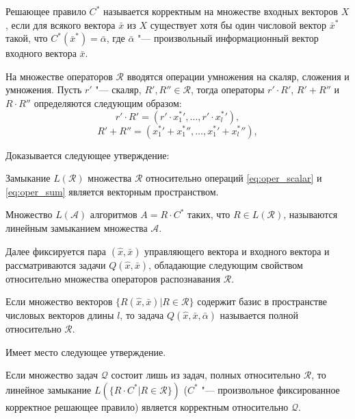 \begin{Def}
	Решающее правило $C^*$ называется корректным на множестве входных векторов $X$, если для всякого вектора $\bar x$ из $X$ существует хотя бы один числовой вектор $\bar x^*$ такой, что $C^*(\bar{x}^*)=\bar{\alpha}$, где $\bar{\alpha}$ "--- произвольный информационный вектор входного вектора $\bar{x}$.
\end{Def}
На множестве операторов $\mathcal R$ вводятся операции умножения на скаляр, сложения и умножения. Пусть $r'$ "--- скаляр, $R',R''\in\mathcal R$, тогда операторы $r'{\cdot}R'$, $R'+R''$ и $R{\cdot}R''$ определяются следующим образом:
\begin{equation}
\label{eq:oper_scalar}
r'{\cdot}R'=(r'{\cdot}{x_1^*}',\dots,r'{\cdot}{x_l^*}'),
\end{equation}
\begin{equation}
\label{eq:oper_sum}
R'+R''=({x_1^*}'+{x_1^*}'',\dots,{x_1^*}'+{x_l^*}''),
\end{equation}

Доказывается следующее утверждение:
\begin{Pred}
	Замыкание $L(\mathcal R)$ множества $\mathcal R$ относительно операций \eqref{eq:oper_scalar} и \eqref{eq:oper_sum} является векторным пространством.
\end{Pred}
\begin{Def}
	Множество $L(\mathcal A)$ алгоритмов $A=R{\cdot}C^*$ таких, что $R{\in}L(\mathcal R)$, называются линейным замыканием множества $\mathcal A$.
\end{Def}

Далее фиксируется пара $(\hat{x},\bar{x})$ управляющего вектора и входного вектора и рассматриваются задачи $Q(\hat{x},\bar{x})$, обладающие следующим свойством относительно множества операторов распознавания $\mathcal{R}$.

\begin{Def}
	Если множество векторов $\{R(\hat{x},\bar{x})|R\in\mathcal R\}$ содержит базис в пространстве числовых векторов длины $l$, то задача $Q(\hat{x},\bar{x},\bar{\alpha})$ называется полной относительно $\mathcal{R}$.
\end{Def}

Имеет место следующее утверждение.
\begin{Pred}\label{st:correctness}
	Если множество задач $\mathcal Q$ состоит лишь из задач, полных относительно $\mathcal R$, то линейное замыкание $L(\{R{\cdot}C^*|R\in\mathcal R\})$ ($C^*$ "--- произвольное фиксированное корректное решающее правило) является корректным относительно $\mathcal Q$.
\end{Pred}

